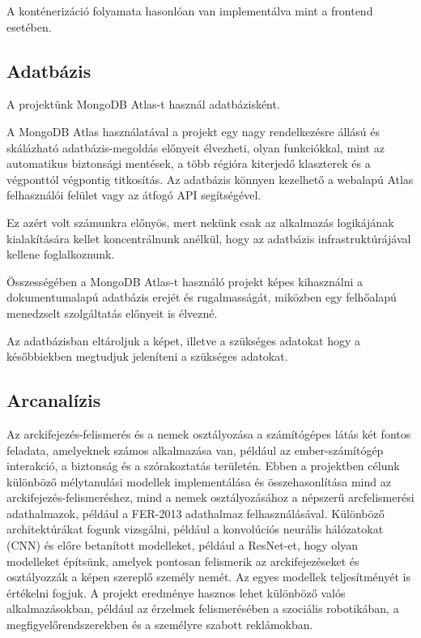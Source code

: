 \documentclass[12pt,a4]{article}
\begin{document}
            A konténerizáció folyamata hasonlóan van implementálva mint a frontend esetében.
         
        \subsection{Adatbázis}
            A projektünk MongoDB Atlas-t használ adatbázisként.

            A MongoDB Atlas használatával a projekt egy nagy rendelkezésre állású és skálázható adatbázis-megoldás előnyeit élvezheti, olyan funkciókkal, mint az automatikus biztonsági mentések, a több régióra kiterjedő klaszterek és a végponttól végpontig titkosítás. Az adatbázis könnyen kezelhető a webalapú Atlas felhasználói felület vagy az átfogó API segítségével. 
            
            Ez azért volt számunkra előnyös, mert nekünk csak az alkalmazás logikájának kialakítására kellet koncentrálnunk anélkül, hogy az adatbázis infrastruktúrájával kellene foglalkoznunk.

            Összességében a MongoDB Atlas-t használó projekt képes kihasználni a dokumentumalapú adatbázis erejét és rugalmasságát, miközben egy felhőalapú menedzselt szolgáltatás előnyeit is élvezné.

            Az adatbázisban eltároljuk a képet, illetve a szükséges adatokat hogy a későbbiekben megtudjuk jeleníteni a szükséges adatokat.
            
        \subsection{Arcanalízis}

            Az arckifejezés-felismerés és a nemek osztályozása a számítógépes látás két fontos feladata, amelyeknek számos alkalmazása van, például az ember-számítógép interakció, a biztonság és a szórakoztatás területén. Ebben a projektben célunk különböző mélytanulási modellek implementálása és összehasonlítása mind az arckifejezés-felismeréshez, mind a nemek osztályozásához a népszerű arcfelismerési adathalmazok, például a FER-2013 adathalmaz felhasználásával. Különböző architektúrákat fogunk vizsgálni, például a konvolúciós neurális hálózatokat (CNN) és előre betanított modelleket, például a ResNet-et, hogy olyan modelleket építsünk, amelyek pontosan felismerik az arckifejezéseket és osztályozzák a képen szereplő személy nemét. Az egyes modellek teljesítményét is értékelni fogjuk. A projekt eredménye hasznos lehet különböző valós alkalmazásokban, például az érzelmek felismerésében a szociális robotikában, a megfigyelőrendszerekben és a személyre szabott reklámokban.
        
\end{document}
